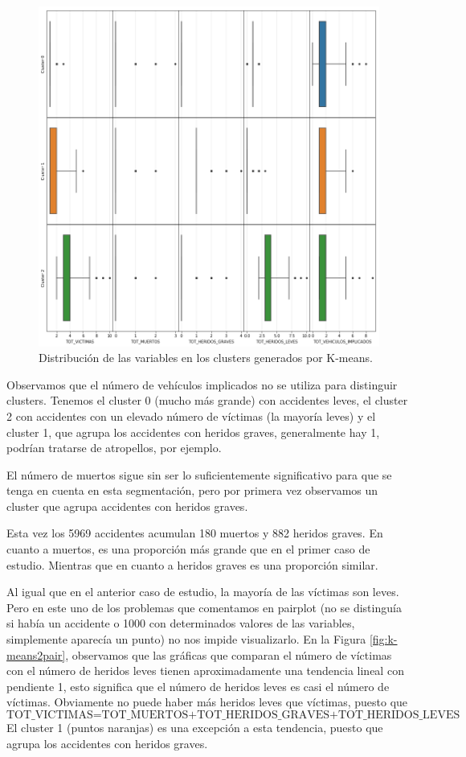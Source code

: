 \documentclass[oneside]{book}
\begin{document}
\begin{figure}[H]
  \centering
  \includegraphics[width=140mm]{figures/accidentes/k-means2distribution}
  \caption{Distribución de las variables en los clusters generados por
    K-means.}
  \label{fig:k-means2distribution}
\end{figure}

Observamos que el número de vehículos implicados no se utiliza para
distinguir clusters. Tenemos el cluster 0 (mucho más grande) con
accidentes leves, el cluster 2 con accidentes con un elevado número de
víctimas (la mayoría leves) y el cluster 1, que agrupa los accidentes
con heridos graves, generalmente hay 1, podrían tratarse de
atropellos, por ejemplo.

El número de muertos sigue sin ser lo suficientemente significativo
para que se tenga en cuenta en esta segmentación, pero por primera vez
observamos un cluster que agrupa accidentes con heridos graves.

Esta vez los 5969 accidentes acumulan 180 muertos y 882 heridos
graves. En cuanto a muertos, es una proporción más grande que en el
primer caso de estudio. Mientras que en cuanto a heridos graves es una
proporción similar.

Al igual que en el anterior caso de estudio, la mayoría de las
víctimas son leves. Pero en este uno de los problemas que comentamos
en pairplot (no se distinguía si había un accidente o 1000 con
determinados valores de las variables, simplemente aparecía un punto)
no nos impide visualizarlo. En la Figura \ref{fig:k-means2pair},
observamos que las gráficas que comparan el número de víctimas con el
número de heridos leves tienen aproximadamente una tendencia lineal
con pendiente 1, esto significa que el número de heridos leves es casi
el número de víctimas. Obviamente no puede haber más heridos leves que
víctimas, puesto que
\[\text{TOT\_VICTIMAS=TOT\_MUERTOS+TOT\_HERIDOS\_GRAVES+TOT\_HERIDOS\_LEVES}\]
El cluster 1 (puntos naranjas) es una excepción a esta tendencia,
puesto que agrupa los accidentes con heridos graves.
\end{document}

